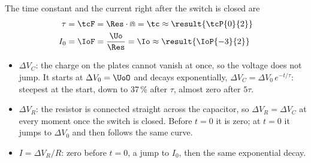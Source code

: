 \begin{abcliste}
\abc The time constant and the current right after the switch is closed are
\begin{align}
 \tau &= \tcF = \Res\cdot\Cap = \tc \approx \result{\tcP{0}{2}} \\
 I_0 &= \IoF = \frac{\Uo}{\Res} = \Io \approx \result{\IoP{-3}{2}}
\end{align}
\begin{itemize}
\item $\Delta V_C$: the charge on the plates cannot vanish at once, so the voltage does not jump. It starts at $\Delta V_0 = \UoO$ and decays exponentially, $\Delta V_C = \Delta V_0\,e^{-t/\tau}$: steepest at the start, down to 37\,\% after $\tau$, almost zero after $5\tau$.
\item $\Delta V_R$: the resistor is connected straight across the capacitor, so $\Delta V_R = \Delta V_C$ at every moment once the switch is closed. Before $t = 0$ it is zero; at $t = 0$ it jumps to $\Delta V_0$ and then follows the same curve.
\item $I = \Delta V_R/R$: zero before $t = 0$, a jump to $I_0$, then the same exponential decay.
\end{itemize}


\end{abcliste}
